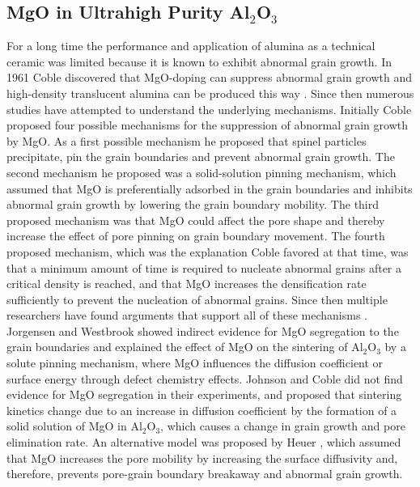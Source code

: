 \subsection{MgO in Ultrahigh Purity Al$_{2}$O$_{3}$}

For a long time the performance and application of alumina as a technical ceramic was limited because it is known to exhibit abnormal grain growth. In 1961 Coble discovered that MgO-doping can suppress abnormal grain growth and high-density translucent alumina can be produced this way \cite{Coble1962a,Coble1962,Coble1961}. Since then numerous studies have attempted to understand the underlying mechanisms. Initially Coble proposed four possible mechanisms for the suppression of abnormal grain growth by MgO. As a first possible mechanism he proposed that spinel particles precipitate, pin the grain boundaries and prevent abnormal grain growth. The second mechanism he proposed was a solid-solution pinning mechanism, which assumed that MgO is preferentially adsorbed in the grain boundaries and inhibits abnormal grain growth by lowering the grain boundary mobility. The third proposed mechanism was that MgO could affect the pore shape and thereby increase the effect of pore pinning on grain boundary movement. The fourth proposed mechanism, which was the explanation Coble favored at that time, was that a minimum amount of time is required to nucleate abnormal grains after a critical density is reached, and that MgO increases the densification rate sufficiently to prevent the nucleation of abnormal grains. Since then multiple researchers have found arguments that support all of these mechanisms \cite{Bennison1990}. Jorgensen and Westbrook \cite{Jorgensen1964,Jorgensen1965} showed indirect evidence for MgO segregation to the grain boundaries and explained the effect of MgO on the sintering of Al$_{2}$O$_{3}$ by a solute pinning mechanism, where MgO influences the diffusion coefficient or surface energy through defect chemistry effects. Johnson and Coble \cite{Johnson1978} did not find evidence for MgO segregation in their experiments, and proposed that sintering kinetics change due to an increase in diffusion coefficient by the formation of a solid solution of MgO in Al$_{2}$O$_{3}$, which causes a change in grain growth and pore elimination rate. An alternative model was proposed by Heuer \cite{Heuer1979}, which assumed that MgO increases the pore mobility by increasing the surface diffusivity and, therefore, prevents pore-grain boundary breakaway and abnormal grain growth. 

